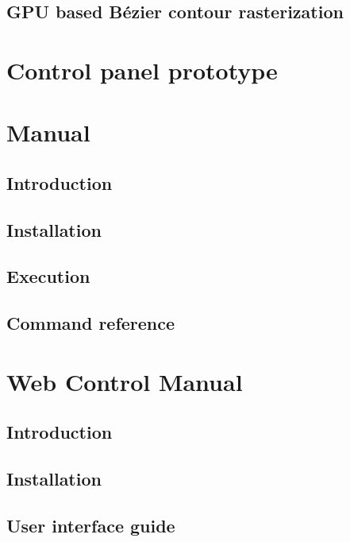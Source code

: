 \documentclass{etsist_pfg}
\begin{document}
\begin{appendices}
\begin{refsection}
\chapter{GPU based Bézier contour rasterization}

\end{refsection}

\chapter{Control panel prototype}


\chapter{Manual}
\section{Introduction}

\section{Installation}

\section{Execution}

\section{Command reference}


\chapter{Web Control Manual}
\section{Introduction}

\section{Installation}

\section{User interface guide}


\end{appendices}
\end{document}

